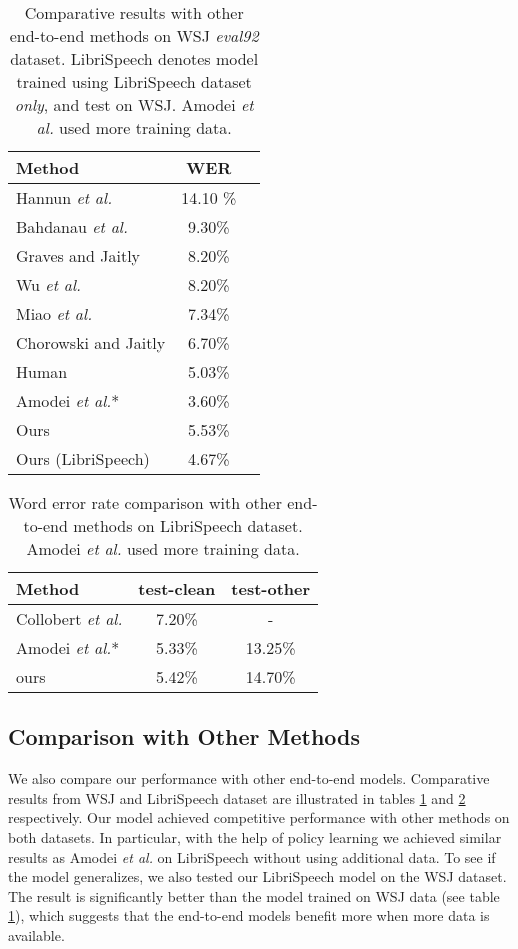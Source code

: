 \documentclass{article}
\newcommand{\etal}{\emph{et al.}\xspace}
\begin{document}
\begin{table}[tbp!]
\centering
\begin{tabular}{lcc}
\toprule
Method  & WER \\
\midrule
Hannun \etal \cite{hannun2014first} & 14.10 \%\\
Bahdanau \etal \cite{bahdanau2016end} & 9.30\%\\
Graves and Jaitly \cite{graves2014towards} & 8.20\% \\
Wu \etal \cite{wu2016multiplicative} & 8.20\% \\
Miao \etal \cite{miao2015eesen} & 7.34\% \\
Chorowski and Jaitly \cite{chorowski2016towards} & 6.70\%\\
Human \cite{amodei2016deep} & 5.03\% \\
Amodei \etal \cite{amodei2016deep}* & 3.60\% \\
Ours & 5.53\%\\
Ours (LibriSpeech) & 4.67\%\\
\bottomrule
\end{tabular}
\caption{Comparative results with other end-to-end methods on WSJ \emph{eval92} dataset. LibriSpeech denotes model trained using LibriSpeech dataset \emph{only}, and test on WSJ. Amodei \etal used more training data.}
\label{tbl:wsj}
\end{table}

\begin{table}[tbp!]
\centering
\begin{tabular}{lcc}
\toprule
Method & test-clean & test-other \\
\midrule
Collobert \etal \cite{collobert2016wav2letter} & 7.20\% & - \\
Amodei \etal \cite{amodei2016deep}* & 5.33\% & 13.25\% \\
ours & 5.42\% & 14.70\% \\
\bottomrule
\end{tabular}
\caption{Word error rate comparison with other end-to-end methods on LibriSpeech dataset. Amodei \etal used more training data.}
\label{tbl:libri}
\end{table}

\subsection{Comparison with Other Methods}
We also compare our performance with other end-to-end models. Comparative results from WSJ and LibriSpeech dataset are illustrated in tables \ref{tbl:wsj} and \ref{tbl:libri} respectively.
Our model achieved competitive performance with other methods on both datasets. In particular, with the help of policy learning we achieved similar results as Amodei \etal \cite{amodei2016deep} on LibriSpeech without using additional data. To see if the model generalizes, we also tested our LibriSpeech model on the WSJ dataset. The result is significantly better than the model trained on WSJ data (see table \ref{tbl:wsj}), which suggests that the end-to-end models benefit more when more data is available. 
\end{document}
